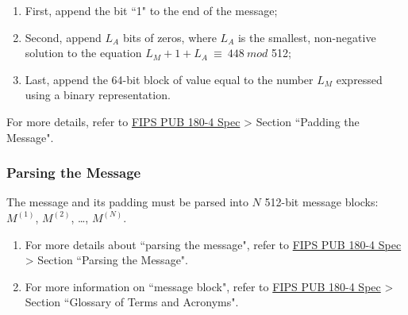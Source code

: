 \documentclass[main\_\_EN.tex]{subfiles}
\begin{document}
\begin{enumerate}
    \item First, append the bit ``1" to the end of the message;
    \item Second, append \begin{math} L_A \end{math} bits of zeros, where \begin{math} L_A \end{math} is the smallest, non-negative solution to the equation \begin{math}L_M + 1 + L_A \ {\equiv} \ 448 \ mod \end{math} 512;
    \item Last, append the 64-bit block of value equal to the number \begin{math} L_M \end{math} expressed using a binary representation.
\end{enumerate}

For more details, refer to \href{https://doi.org/10.6028/NIST.FIPS.180-4}{FIPS PUB 180-4 Spec} > Section ``Padding the Message".

\subsubsection{Parsing the Message}\label{sec:ecdsa-msg-parsing}

The message and its padding must be parsed into \begin{math}N\end{math} 512-bit message blocks: \begin{math}M^{(1)}\end{math}, \begin{math}M^{(2)}\end{math}, \dots, \begin{math}M^{(N)}\end{math}.

\begin{tiplisting}
\begin{enumerate}
\vspace{-2.5em}
    \item For more details about ``parsing the message", refer to \href{https://doi.org/10.6028/NIST.FIPS.180-4}{FIPS PUB 180-4 Spec} > Section ``Parsing the Message".
    \item For more information on ``message block", refer to \href{https://doi.org/10.6028/NIST.FIPS.180-4}{FIPS PUB 180-4 Spec} > Section ``Glossary of Terms and Acronyms".
\end{enumerate}
\end{tiplisting}
\end{document}
